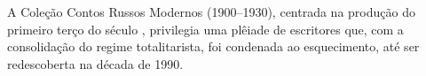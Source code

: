 A Coleção Contos Russos Modernos (1900--1930), centrada na produção do primeiro terço do século , privilegia uma plêiade de escritores que, com a consolidação do regime totalitarista, foi condenada ao esquecimento, até ser redescoberta na década de 1990.

\vfill

\hspace*{-.4cm}\begin{minipage}[c]{.5\linewidth}
\small{
{}}
\end{minipage}


\pagebreak

\vspace*{1.5cm}


\bigskip

\hfill{}

\bigskip
\bigskip
\bigskip

